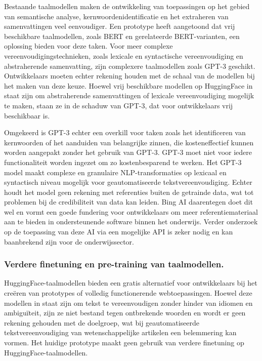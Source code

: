 Bestaande taalmodellen maken de ontwikkeling van toepassingen op het gebied van semantische analyse, kernwoordenidentificatie en het extraheren van samenvattingen veel eenvoudiger. Een prototype heeft aangetoond dat vrij beschikbare taalmodellen, zoals BERT en gerelateerde BERT-varianten, een oplossing bieden voor deze taken. Voor meer complexe vereenvoudigingstechnieken, zoals lexicale en syntactische vereenvoudiging en abstraherende samenvatting, zijn complexere taalmodellen zoals GPT-3 geschikt. Ontwikkelaars moeten echter rekening houden met de schaal van de modellen bij het maken van deze keuze. Hoewel vrij beschikbare modellen op HuggingFace in staat zijn om abstraherende samenvattingen of lexicale vereenvoudiging mogelijk te maken, staan ze in de schaduw van GPT-3, dat voor ontwikkelaars vrij beschikbaar is. 

\medspace

Omgekeerd is GPT-3 echter een overkill voor taken zoals het identificeren van kernwoorden of het aanduiden van belangrijke zinnen, die kosteneffectief kunnen worden aangepakt zonder het gebruik van GPT-3. GPT-3 moet niet voor iedere functionaliteit worden ingezet om zo kostenbesparend te werken. Het GPT-3 model maakt complexe en granulaire NLP-transformaties op lexicaal en syntactisch niveau mogelijk voor geautomatiseerde tekstvereenvoudiging. Echter houdt het model geen rekening met referenties buiten de getrainde data, wat tot problemen bij de credibiliteit van data kan leiden. Bing AI daarentegen doet dit wel en vormt een goede fundering voor ontwikkelaars om meer referentiemateriaal aan te bieden in ondersteunende software binnen het onderwijs. Verder onderzoek op de toepassing van deze AI via een mogelijke API is zeker nodig en kan baanbrekend zijn voor de onderwijssector. 

\subsubsection{Verdere finetuning en pre-training van taalmodellen.}

HuggingFace-taalmodellen bieden een gratis alternatief voor ontwikkelaars bij het creëren van prototypes of volledig functionerende webtoepassingen. Hoewel deze modellen in staat zijn om tekst te vereenvoudigen zonder hinder van idiomen en ambiguïteit, zijn ze niet bestand tegen ontbrekende woorden en wordt er geen rekening gehouden met de doelgroep, wat bij geautomatiseerde tekstvereenvoudiging van wetenschappelijke artikelen een belemmering kan vormen. Het huidige prototype maakt geen gebruik van verdere finetuning op HuggingFace-taalmodellen.

